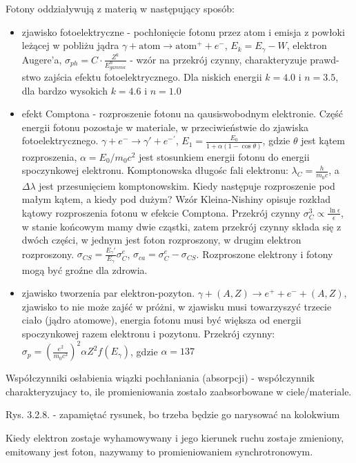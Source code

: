 \documentclass{article}
\begin{document}
Fotony oddziaływują z materią w następujący sposób:
\begin{itemize}
    \item zjawisko fotoelektryczne - pochłonięcie fotonu przez atom i emisja z powłoki leżącej w pobliżu jądra $\gamma + \mathrm{atom} \rightarrow \mathrm{atom}^+ + e^-$, $E_k = E_{\gamma} - W$, elektron Augere'a, $\sigma_{ph} = C\cdot \frac{Z^k}{E_{gamma}^n}$ - wzór na przekrój czynny, charakteryzuje prawd-stwo zajścia efektu fotoelektrycznego. Dla niskich energii $k=4.0$ i $n=3.5$, dla bardzo wysokich $k=4.6$ i $n=1.0$
    \item efekt Comptona - rozproszenie fotonu na qausiswobodnym elektronie. Część energii fotonu pozostaje w materiale, w przeciwieństwie do zjawiska fotoelektrycznego. $\gamma + e^- \rightarrow \gamma' + e^{-'}$, $E_1 = \frac{E_0}{1 + \alpha(1-\cos\theta)}$, gdzie $\theta$ jest kątem rozproszenia, $\alpha = E_0/m_0c^2$ jest stosunkiem energii fotonu do energii spoczynkowej elektronu. Komptonowska długośc fali elektronu: $\lambda_C = \frac{h}{m_0c}$, a $\Delta \lambda$ jest przesunięciem komptonowskim. Kiedy następuje rozproszenie pod małym kątem, a kiedy pod dużym? Wzór Kleina-Nishiny opisuje rozkład kątowy rozproszenia fotonu w efekcie Comptona. Przekrój czynny $\sigma_C^3 \propto \frac{\ln \epsilon}{\epsilon}$, w stanie końcowym mamy dwie cząstki, zatem przekrój czynny składa się z dwóch części, w jednym jest foton rozproszony, w drugim elektron rozproszony. $\sigma_{CS} = \frac{E_{\gamma}'}{E_{\gamma}}\sigma_C^e$, $\sigma_{ca} = \sigma_C^e - \sigma_{CS}$. Rozproszone elektrony i fotony mogą być groźne dla zdrowia.
    \item zjawisko tworzenia par elektron-pozyton. $\gamma + (A,Z) \rightarrow e^+ + e^- + (A,Z)$, zjawisko to nie może zajść w próżni, w zjawisku musi towarzyszyć trzecie ciało (jądro atomowe), energia fotonu musi być większa od energii spoczynkowej razem elektronu i pozytonu. Przekrój czynny: $\sigma_p = \left(\frac{e^2}{m_0c^2}\right)^2\alpha Z^2 f(E_{\gamma})$, gdzie $\alpha = 137$
\end{itemize}

Współczynniki osłabienia wiązki pochłaniania (absorpcji) - współczynnik charakteryzujacy to, ile promieniowania zostało zaabsorbowane w ciele\slash materiale.

Rys. 3.2.8. - zapamiętać rysunek, bo trzeba będzie go narysować na kolokwium

Kiedy elektron zostaje wyhamowywany i jego kierunek ruchu zostaje zmieniony, emitowany jest foton, nazywamy to promieniowaniem synchrotronowym.
\end{document}
